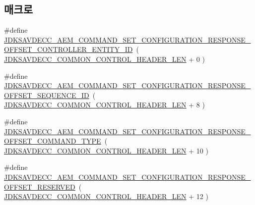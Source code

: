 \subsection*{매크로}
\begin{DoxyCompactItemize}
\item 
\#define \hyperlink{group__command__set__configuration__response_ga6d5eb44080d20abd5652760a95e46bfa}{J\+D\+K\+S\+A\+V\+D\+E\+C\+C\+\_\+\+A\+E\+M\+\_\+\+C\+O\+M\+M\+A\+N\+D\+\_\+\+S\+E\+T\+\_\+\+C\+O\+N\+F\+I\+G\+U\+R\+A\+T\+I\+O\+N\+\_\+\+R\+E\+S\+P\+O\+N\+S\+E\+\_\+\+O\+F\+F\+S\+E\+T\+\_\+\+C\+O\+N\+T\+R\+O\+L\+L\+E\+R\+\_\+\+E\+N\+T\+I\+T\+Y\+\_\+\+ID}~( \hyperlink{group__jdksavdecc__avtp__common__control__header_gaae84052886fb1bb42f3bc5f85b741dff}{J\+D\+K\+S\+A\+V\+D\+E\+C\+C\+\_\+\+C\+O\+M\+M\+O\+N\+\_\+\+C\+O\+N\+T\+R\+O\+L\+\_\+\+H\+E\+A\+D\+E\+R\+\_\+\+L\+EN} + 0 )
\item 
\#define \hyperlink{group__command__set__configuration__response_ga87dac34dacfa1aa750d3b0f87751349a}{J\+D\+K\+S\+A\+V\+D\+E\+C\+C\+\_\+\+A\+E\+M\+\_\+\+C\+O\+M\+M\+A\+N\+D\+\_\+\+S\+E\+T\+\_\+\+C\+O\+N\+F\+I\+G\+U\+R\+A\+T\+I\+O\+N\+\_\+\+R\+E\+S\+P\+O\+N\+S\+E\+\_\+\+O\+F\+F\+S\+E\+T\+\_\+\+S\+E\+Q\+U\+E\+N\+C\+E\+\_\+\+ID}~( \hyperlink{group__jdksavdecc__avtp__common__control__header_gaae84052886fb1bb42f3bc5f85b741dff}{J\+D\+K\+S\+A\+V\+D\+E\+C\+C\+\_\+\+C\+O\+M\+M\+O\+N\+\_\+\+C\+O\+N\+T\+R\+O\+L\+\_\+\+H\+E\+A\+D\+E\+R\+\_\+\+L\+EN} + 8 )
\item 
\#define \hyperlink{group__command__set__configuration__response_ga641e21bd4ae8822c2975c8b877692091}{J\+D\+K\+S\+A\+V\+D\+E\+C\+C\+\_\+\+A\+E\+M\+\_\+\+C\+O\+M\+M\+A\+N\+D\+\_\+\+S\+E\+T\+\_\+\+C\+O\+N\+F\+I\+G\+U\+R\+A\+T\+I\+O\+N\+\_\+\+R\+E\+S\+P\+O\+N\+S\+E\+\_\+\+O\+F\+F\+S\+E\+T\+\_\+\+C\+O\+M\+M\+A\+N\+D\+\_\+\+T\+Y\+PE}~( \hyperlink{group__jdksavdecc__avtp__common__control__header_gaae84052886fb1bb42f3bc5f85b741dff}{J\+D\+K\+S\+A\+V\+D\+E\+C\+C\+\_\+\+C\+O\+M\+M\+O\+N\+\_\+\+C\+O\+N\+T\+R\+O\+L\+\_\+\+H\+E\+A\+D\+E\+R\+\_\+\+L\+EN} + 10 )
\item 
\#define \hyperlink{group__command__set__configuration__response_ga78c41d056060d63c19d92a77eb3b3278}{J\+D\+K\+S\+A\+V\+D\+E\+C\+C\+\_\+\+A\+E\+M\+\_\+\+C\+O\+M\+M\+A\+N\+D\+\_\+\+S\+E\+T\+\_\+\+C\+O\+N\+F\+I\+G\+U\+R\+A\+T\+I\+O\+N\+\_\+\+R\+E\+S\+P\+O\+N\+S\+E\+\_\+\+O\+F\+F\+S\+E\+T\+\_\+\+R\+E\+S\+E\+R\+V\+ED}~( \hyperlink{group__jdksavdecc__avtp__common__control__header_gaae84052886fb1bb42f3bc5f85b741dff}{J\+D\+K\+S\+A\+V\+D\+E\+C\+C\+\_\+\+C\+O\+M\+M\+O\+N\+\_\+\+C\+O\+N\+T\+R\+O\+L\+\_\+\+H\+E\+A\+D\+E\+R\+\_\+\+L\+EN} + 12 )

\end{DoxyCompactItemize}
